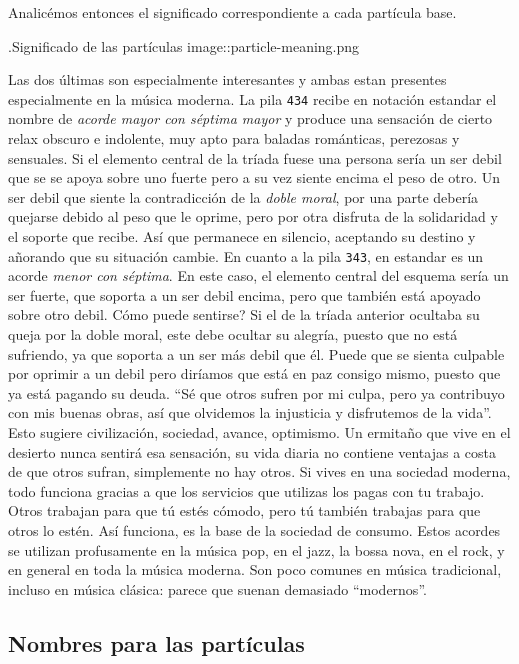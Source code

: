 \documentclass[]{article}
\begin{document}
Analicémos entonces el significado correspondiente a cada partícula base.

.Significado de las partículas image::particle-meaning.png

Las dos últimas son especialmente interesantes y ambas estan presentes especialmente en la música moderna. La pila \texttt{434} recibe en notación estandar el nombre de \emph{acorde mayor con séptima mayor} y produce una sensación de cierto relax obscuro e indolente, muy apto para baladas románticas, perezosas y sensuales. Si el elemento central de la tríada fuese una persona sería un ser debil que se se apoya sobre uno fuerte pero a su vez siente encima el peso de otro. Un ser debil que siente la contradicción de la \emph{doble moral}, por una parte debería quejarse debido al peso que le oprime, pero por otra disfruta de la solidaridad y el soporte que recibe. Así que permanece en silencio, aceptando su destino y añorando que su situación cambie. En cuanto a la pila \texttt{343}, en estandar es un acorde \emph{menor con séptima}. En este caso, el elemento central del esquema sería un ser fuerte, que soporta a un ser debil encima, pero que también está apoyado sobre otro debil. Cómo puede sentirse? Si el de la tríada anterior ocultaba su queja por la doble moral, este debe ocultar su alegría, puesto que no está sufriendo, ya que soporta a un ser más debil que él. Puede que se sienta culpable por oprimir a un debil pero diríamos que está en paz consigo mismo, puesto que ya está pagando su deuda. ``Sé que otros sufren por mi culpa, pero ya contribuyo con mis buenas obras, así que olvidemos la injusticia y disfrutemos de la vida''. Esto sugiere civilización, sociedad, avance, optimismo. Un ermitaño que vive en el desierto nunca sentirá esa sensación, su vida diaria no contiene ventajas a costa de que otros sufran, simplemente no hay otros. Si vives en una sociedad moderna, todo funciona gracias a que los servicios que utilizas los pagas con tu trabajo. Otros trabajan para que tú estés cómodo, pero tú también trabajas para que otros lo estén. Así funciona, es la base de la sociedad de consumo. Estos acordes se utilizan profusamente en la música pop, en el jazz, la bossa nova, en el rock, y en general en toda la música moderna. Son poco comunes en música tradicional, incluso en música clásica: parece que suenan demasiado ``modernos''.

\subsection{Nombres para las partículas}
\end{document}
